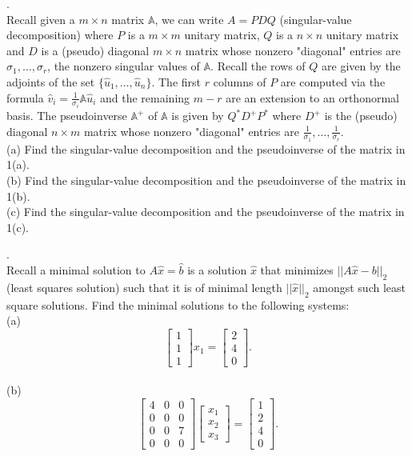 \documentclass[12 pt]{article}
\begin{document}
. \\Recall given a $m \times n$ matrix $\mathbb{A}$, we can write $A=PDQ$ (singular-value decomposition) where $P$ is a $m \times m$ unitary matrix, $Q$ is a $n \times n$ unitary matrix and $D$ is a (pseudo) diagonal $m \times n$ matrix whose nonzero "diagonal" entries are $\sigma_1, \dots, \sigma_r$, the nonzero singular values of $\mathbb{A}$. Recall the rows of $Q$ are given by the adjoints of the set $\{ \hat{u}_1, \dots, \hat{u}_n \}$. The first $r$ columns of $P$ are computed 
via the formula $\hat{v}_i = \frac{1}{\sigma_i} \mathbb{A} \hat{u}_i$ and the remaining $m-r$ are an extension to an orthonormal basis. The pseudoinverse 
$\mathbb{A}^+$ of $\mathbb{A}$ is given by $Q^*D^+P^*$ where $D^+$ is the (pseudo) diagonal $n \times m$ matrix whose nonzero 
"diagonal" entries are $\frac{1}{\sigma_1}, \dots, \frac{1}{\sigma_r}$. \\
(a) Find the singular-value decomposition and the pseudoinverse of the matrix in 1(a). \\
(b) Find the singular-value decomposition and the pseudoinverse of the matrix in 1(b). \\
(c) Find the singular-value decomposition and the pseudoinverse of the matrix in 1(c). \\

\medskip

. \\
Recall a minimal solution to $A\hat{x}=\hat{b}$ is  a solution $\hat{x}$ that minimizes $||A\hat{x}-b||_2$ (least squares solution) such that it is of minimal length $||\hat{x}||_2$ amongst such least square solutions. Find the minimal solutions to the following systems: \\
(a) 
$$\begin{bmatrix} 1 \\ 1 \\1 \end{bmatrix} x_1 = \begin{bmatrix} 2 \\ 4 \\ 0 \end{bmatrix}.$$ \\
(b) 
$$\begin{bmatrix} 4 & 0 & 0 \\ 0 & 0 & 0 \\ 0 & 0 & 7 \\ 0 & 0 & 0 \end{bmatrix} \begin{bmatrix} x_1 \\ x_2 \\ x_3 \end{bmatrix} 
= \begin{bmatrix} 1 \\ 2 \\ 4 \\ 0 \end{bmatrix}.$$
\end{document}
